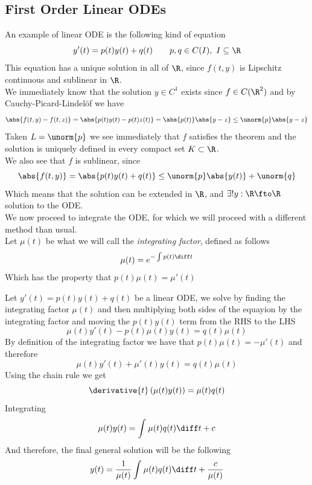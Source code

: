 \documentclass[../mmf.tex]{subfiles}
\begin{document}
\subsection{First Order Linear ODEs}
\begin{dfn}
	An example of linear ODE is the following kind of equation
	\begin{equation}
		y'(t)=p(t)y(t)+q(t)\qquad p,q\in C(I),\ I\subseteq\R
		\label{eq:integratingfactor}
	\end{equation}
	This equation has a unique solution in all of $\R$, since $f(t,y)$ is Lipschitz continuous and sublinear in $\R$.\\
	We immediately know that the solution $y\in C^1$ exists since $f\in C(\R^2)$ and by Cauchy-Picard-Lindelöf we have
	\begin{equation*}
		\abs{f(t,y)-f(t,z)}=\abs{p(t)y(t)-p(t)z(t)}=\abs{p(t)}\abs{y-z}\le\unorm{p}\abs{y-z}
	\end{equation*}
	Taken $L=\unorm{p}$ we see immediately that $f$ satisfies the theorem and the solution is uniquely defined in every compact set $K\subset\R$.\\
	We also see that $f$ is sublinear, since
	\begin{equation*}
		\abs{f(t,y)}=\abs{p(t)y(t)+q(t)}\le\unorm{p}\abs{y(t)}+\unorm{q}
	\end{equation*}
	Which means that the solution can be extended in $\R$, and $\exists!y:\R\fto\R$ solution to the ODE.\\
	We now proceed to integrate the ODE, for which we will proceed with a different method than usual.\\
	Let $\mu(t)$ be what we will call the \textit{integrating factor}, defined as follows
	\begin{equation*}
		\mu(t)=e^{-\int p(t)\diff t}
	\end{equation*}
	Which has the property that $p(t)\mu(t)=\mu'(t)$
\end{dfn}
\begin{mtd}
	Let $y'(t)=p(t)y(t)+q(t)$ be a linear ODE, we solve by finding the integrating factor $\mu(t)$ and then multiplying both sides of the equayion by the integrating factor and moving the $p(t)y(t)$ term from the RHS to the LHS
	\begin{equation*}
		\mu(t)y'(t)-p(t)\mu(t)y(t)=q(t)\mu(t)
	\end{equation*}
	By definition of the integrating factor we have that $p(t)\mu(t)=-\mu'(t)$ and therefore
	\begin{equation*}
		\mu(t)y'(t)+\mu'(t)y(t)=q(t)\mu(t)
	\end{equation*}
	Using the chain rule we get
	\begin{equation*}
		\derivative{t}\left( \mu(t)y(t) \right)=\mu(t)q(t)
	\end{equation*}
	Integrating
	\begin{equation*}
		\mu(t)y(t)=\int_{}^{}\mu(t)q(t)\diff t+c
	\end{equation*}
	And therefore, the final general solution will be the following
	\begin{equation*}
		y(t)=\frac{1}{\mu(t)}\int_{}^{}\mu(t)q(t)\diff t+\frac{c}{\mu(t)}
	\end{equation*}
\end{mtd}
\end{document}
